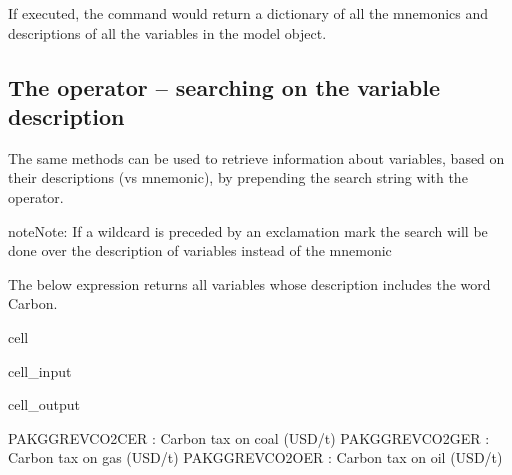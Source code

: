 \documentclass[letterpaper,10pt,english]{jupyterBook}
\begin{document}
\sphinxAtStartPar
If executed, the command  would return a dictionary of all the mnemonics and descriptions of all the variables in the  model object.


\subsection{The \sphinxstyleliteralintitle{\sphinxupquote{!}} operator – searching on the variable description}
\label{\detokenize{content/05_WBModels/LoadingWBModel:the-operator-searching-on-the-variable-description}}
\sphinxAtStartPar
The same methods can be used to retrieve information about variables, based on their descriptions (vs mnemonic), by pre\sphinxhyphen{}pending the search string with the  \sphinxcode{\sphinxupquote{!}} operator.

\begin{sphinxadmonition}{note}{Note:}
\sphinxAtStartPar
{}
If a wildcard is preceded by an exclamation mark \sphinxstylestrong{!} the search will be done over the description of variables instead of the mnemonic
\end{sphinxadmonition}

\sphinxAtStartPar
The below expression returns all variables whose description includes the word Carbon.

\begin{sphinxuseclass}{cell}\begin{sphinxVerbatimInput}

\begin{sphinxuseclass}{cell_input}
\begin{sphinxVerbatim}[commandchars=\\\{\}]
\PYG{p}{[}\PYG{p}{]}
\end{sphinxVerbatim}

\end{sphinxuseclass}\end{sphinxVerbatimInput}
\begin{sphinxVerbatimOutput}

\begin{sphinxuseclass}{cell_output}
\begin{sphinxVerbatim}[commandchars=\\\{\}]
PAKGGREVCO2CER : Carbon tax on coal (USD/t)
PAKGGREVCO2GER : Carbon tax on gas (USD/t)
PAKGGREVCO2OER : Carbon tax on oil (USD/t)
\end{sphinxVerbatim}

\end{sphinxuseclass}\end{sphinxVerbatimOutput}

\end{sphinxuseclass}
\end{document}
